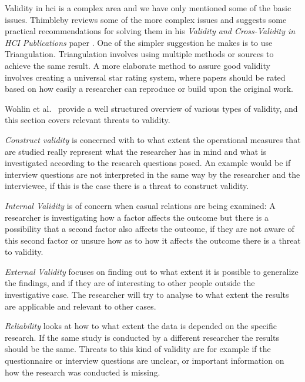 Validity in \gls{hci} is a complex area and we have only mentioned some of the basic issues. Thimbleby reviews some of the more complex issues and suggests some practical recommendations for solving them in his \textit{Validity and Cross-Validity in HCI Publications} paper \cite{validation}. One of the simpler suggestion he makes is to use Triangulation. Triangulation involves using multiple methods or sources to achieve the same result. A more elaborate method to assure good validity involves creating a universal star rating system, where papers should be rated based on how easily a researcher can reproduce or build upon the original work.

\label{subsec:threatsValidity}
Wohlin et al.~\cite{experiment} provide a well structured overview of various types of validity, and this section covers relevant threats to validity.

\textit{Construct validity} is concerned with to what extent the operational measures that are studied really represent what the researcher has in mind and what is investigated according to the research questions posed. An example would be if interview questions are not interpreted in the same way by the researcher and the interviewee, if this is the case there is a threat to construct validity.

\textit{Internal Validity} is of concern when casual relations are being examined: A researcher is investigating how a factor affects the outcome but there is a possibility that a second factor also affects the outcome, if they are not aware of this second factor or unsure how as to how it affects the outcome there is a threat to validity.

\textit{External Validity} focuses on finding out to what extent it is possible to generalize the findings, and if they are of interesting to other people outside the investigative case. The researcher will try to analyse to what extent the results are applicable and relevant to other cases.

\textit{Reliability} looks at how to what extent the data is depended on the specific research. If the same study is conducted by a different researcher the results should be the same. Threats to this kind of validity are for example if the questionnaire or interview questions are unclear, or important information on how the research was conducted is missing.



